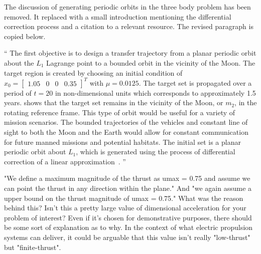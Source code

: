 \documentclass[11pt]{article}
\newenvironment{correction}{\begin{list}{}{\setlength{\leftmargin}{1cm}\setlength{\rightmargin}{1cm}}\vspace{\parsep}\item[]``}{''\end{list}}
\begin{document}
\begin{enumerate}
The discussion of generating periodic orbits in the three body problem has been removed.
It replaced with a small introduction mentioning the differential correction process and a citation to a relevant resource. 
The revised paragraph is copied below.

\begin{correction}
The first objective is to design a transfer trajectory from a planar periodic orbit about the \( L_1\) Lagrange point to a bounded orbit in the vicinity of the Moon.
The target region is created by choosing an initial condition of \( x_0 = \begin{bmatrix}1.05 & 0 & 0 & 0.35 \end{bmatrix}^T \) with \( \mu = 0.0125 \).
The target set is propagated over a period of \( t = \num{20} \) in non-dimensional units which corresponds to approximately \num{1.5} years.
 shows that the target set remains in the vicinity of the Moon, or \( m_2\), in the rotating reference frame. 
This type of orbit would be useful for a variety of mission scenarios.
The bounded trajectories of the vehicles and constant line of sight to both the Moon and the Earth would allow for constant communication for future manned missions and potential habitats.
The initial set is a planar periodic orbit about \( L_1\), which is generated using the process of differential correction of a linear approximation~\cite{koon2011}.
\end{correction}

\item
    \begin{itshape}
"We define a maximum magnitude of the thrust as umax = 0.75 and assume we can point the thrust in any direction within the plane." And  "we again assume a upper bound on the thrust magnitude of umax = 0.75."  What was the reason behind this? Isn't this a pretty large value of dimensional acceleration for your problem of interest?  Even if it's chosen for demonstrative purposes, there should be some sort of explanation as to why.  In the context of what electric propulsion systems can deliver, it could be arguable that this value isn't really "low-thrust" but "finite-thrust".
\end{itshape}


\end{enumerate}
\end{document}
